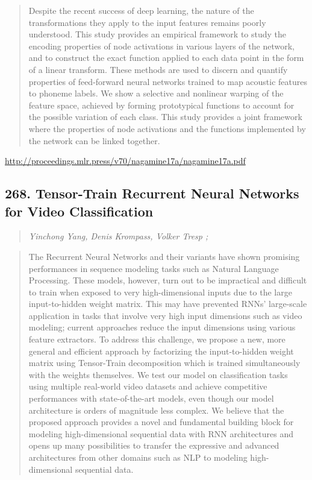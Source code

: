 \documentclass{article}
\begin{document}
\begin{quote}
    Despite the recent success of deep learning, the nature of the transformations they apply to the input features remains poorly understood. This study provides an empirical framework to study the encoding properties of node activations in various layers of the network, and to construct the exact function applied to each data point in the form of a linear transform. These methods are used to discern and quantify properties of feed-forward neural networks trained to map acoustic features to phoneme labels. We show a selective and nonlinear warping of the feature space, achieved by forming prototypical functions to account for the possible variation of each class. This study provides a joint framework where the properties of node activations and the functions implemented by the network can be linked together.  
\end{quote}

\href{http://proceedings.mlr.press/v70/nagamine17a/nagamine17a.pdf}{http://proceedings.mlr.press/v70/nagamine17a/nagamine17a.pdf}

\subsection{268. Tensor-Train Recurrent Neural Networks for Video Classification}

\begin{quote}
\footnotesize{\textit{Yinchong Yang, Denis Krompass, Volker Tresp ;}}

\end{quote}

\begin{quote}
    The Recurrent Neural Networks and their variants have shown promising performances in sequence modeling tasks such as Natural Language Processing. These models, however, turn out to be impractical and difficult to train when exposed to very high-dimensional inputs due to the large input-to-hidden weight matrix. This may have prevented RNNs’ large-scale application in tasks that involve very high input dimensions such as video modeling; current approaches reduce the input dimensions using various feature extractors. To address this challenge, we propose a new, more general and efficient approach by factorizing the input-to-hidden weight matrix using Tensor-Train decomposition which is trained simultaneously with the weights themselves. We test our model on classification tasks using multiple real-world video datasets and achieve competitive performances with state-of-the-art models, even though our model architecture is orders of magnitude less complex. We believe that the proposed approach provides a novel and fundamental building block for modeling high-dimensional sequential data with RNN architectures and opens up many possibilities to transfer the expressive and advanced architectures from other domains such as NLP to modeling high-dimensional sequential data.  
\end{quote}
\end{document}

